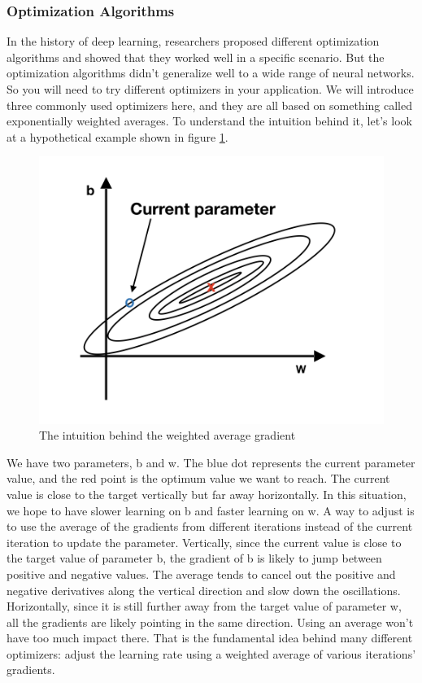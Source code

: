 \documentclass[
  12pt,
]{krantz}
\begin{document}
\hypertarget{optimization-algorithms}{%
\subsubsection{Optimization Algorithms}\label{optimization-algorithms}}

In the history of deep learning, researchers proposed different optimization algorithms and showed that they worked well in a specific scenario. But the optimization algorithms didn't generalize well to a wide range of neural networks. So you will need to try different optimizers in your application. We will introduce three commonly used optimizers here, and they are all based on something called exponentially weighted averages. To understand the intuition behind it, let's look at a hypothetical example shown in figure \ref{fig:weightedagv}.

\begin{figure}

{\centering \includegraphics[width=0.6\linewidth]{images/weighted_agv} 

}

\caption{The intuition behind the weighted average gradient}\label{fig:weightedagv}
\end{figure}

We have two parameters, b and w. The blue dot represents the current parameter value, and the red point is the optimum value we want to reach. The current value is close to the target vertically but far away horizontally. In this situation, we hope to have slower learning on b and faster learning on w. A way to adjust is to use the average of the gradients from different iterations instead of the current iteration to update the parameter. Vertically, since the current value is close to the target value of parameter b, the gradient of b is likely to jump between positive and negative values. The average tends to cancel out the positive and negative derivatives along the vertical direction and slow down the oscillations. Horizontally, since it is still further away from the target value of parameter w, all the gradients are likely pointing in the same direction. Using an average won't have too much impact there. That is the fundamental idea behind many different optimizers: adjust the learning rate using a weighted average of various iterations' gradients.
\end{document}

